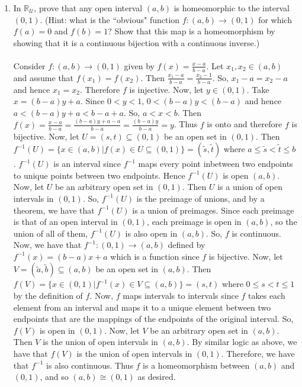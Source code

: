\documentclass[12pt]{article}
\begin{document}
\begin{enumerate}
\item In $\mathbb{R}_{\mathcal{U}}$, prove that any open interval $(a,b)$ is homeomorphic to the interval $(0,1)$. (Hint: what is the ``obvious" function $f:(a,b)\to(0,1)$ for which $f(a) = 0$ and $f(b) = 1$? Show that this map is a homeomorphism by showing that it is a continuous bijection with a continuous inverse.)\\\\
Consider $f:(a,b)\to(0,1)$ given by $f(x)=\frac{x-a}{b-a}$. Let $x_1,x_2\in(a,b)$ and assume that $f(x_1)=f(x_2)$. Then $\frac{x_1-a}{b-a}=\frac{x_2-1}{b-a}$. So, $x_1-a=x_2-a$ and hence $x_1=x_2$. Therefore $f$ is injective. Now, let $y\in(0,1)$. Take $x=(b-a)y+a$. Since $0<y<1$, $0<(b-a)y<(b-a)$ and hence $a<(b-a)y+a<b-a+a$. So, $a<x<b$. Then $f(x)=\frac{x-a}{b-a}=\frac{(b-a)y+a-a}{b-a}=\frac{(b-a)y}{b-a}=y$. Thus $f$ is onto and therefore $f$ is bijective. Now, let $U=(s,t)\subseteq(0,1)$ be an open set in $(0,1)$. Then $f^{-1}(U)=\{x\in(a,b)|f(x)\in U\subseteq(0,1)\}=(\tilde{s},\tilde{t})$ where $a\leq\tilde{s}<\tilde{t}\leq b$. $f^{-1}(U)$ is an interval since $f^{-1}$ maps every point inbetween two endpoints to unique points between two endpoints. Hence $f^{-1}(U)$ is open $(a,b)$. Now, let $U$ be an arbitrary open set in $(0,1)$. Then $U$ is a union of open intervals in $(0,1)$. So, $f^{-1}(U)$ is the preimage of unions, and by a theorem, we have that $f^{-1}(U)$ is a union of preimages. Since each preimage is that of an open interval in $(0,1)$, each preimage is open in $(a,b)$, so the union of all of them, $f^{-1}(U)$ is also open in $(a,b)$. So, $f$ is continuous. Now, we have that $f^{-1}:(0,1)\rightarrow(a,b)$ defined by $f^{-1}(x)=(b-a)x+a$ which is a function since $f$ is bijective. Now, let $V=(\tilde{a},\tilde{b})\subseteq(a,b)$ be an open set in $(a,b)$. Then $f(V)=\{x\in(0,1)|f^{-1}(x)\in V\subseteq(a,b)\}=(s,t)$ where $0\leq s<t\leq1$ by the definition of $f$. Now, $f$ maps intervals to intervals since $f$ takes each element from an interval and maps it to a unique element between two endpoints that are the mappings of the endpoints of the original interval. So, $f(V)$ is open in $(0,1)$. Now, let $V$ be an arbitrary open set in $(a,b)$. Then $V$ is the union of open intervals in $(a,b)$. By similar logic as above, we have that $f(V)$ is the union of open intervals in $(0,1)$. Therefore, we have that $f^{-1}$ is also continuous. Thus $f$ is a homeomorphism between $(a,b)$ and $(0,1)$, and so $(a,b)\cong(0,1)$ as desired.\\[20pt]


\end{enumerate}
\end{document}
